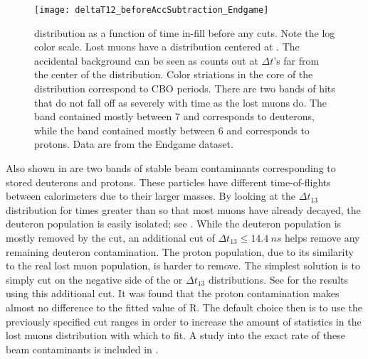 
\begin{figure}
\centering
\texttt{[image: deltaT12\_beforeAccSubtraction\_Endgame]}
\caption[Lost muon \DT distribution as a function of time in-fill]{\DT distribution as a function of time in-fill before any cuts. Note the log color scale. Lost muons have a \DT distribution centered at . The accidental background can be seen as counts out at $\Delta t$'s far from the center of the distribution. Color striations in the core of the distribution correspond to CBO periods. There are two bands of hits that do not fall off as severely with time as the lost muons do. The band contained mostly between 7 and  corresponds to deuterons, while the band contained mostly between 6 and  corresponds to protons. Data are from the Endgame dataset.}
\label{fig:deltaT12_AccSub}
\end{figure}


Also shown in  are two bands of stable beam contaminants corresponding to stored deuterons and protons. These particles have different time-of-flights between calorimeters due to their larger masses. By looking at the $\Delta t_{13}$ distribution for times greater than  so that most muons have already decayed, the deuteron population is easily isolated; see . While the deuteron population is mostly removed by the \DT cut, an additional cut of $\Delta t_{13} \leq \SI{14.4}{ns}$ helps remove any remaining deuteron contamination. The proton population, due to its similarity to the real lost muon population, is harder to remove. The simplest solution is to simply cut on the negative side of the \DT or $\Delta t_{13}$ distributions. See  for the results using this additional cut. It was found that the proton contamination makes almost no difference to the fitted value of R. The default choice then is to use the previously specified cut ranges in order to increase the amount of statistics in the lost muons distribution with which to fit. A study into the exact rate of these beam contaminants is included in .


